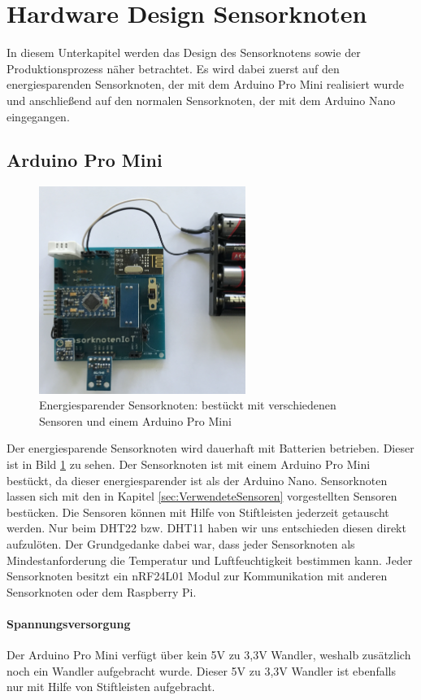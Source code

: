 \section{Hardware Design Sensorknoten}
\label{sec:HardwareDesign}
In diesem Unterkapitel werden das Design des Sensorknotens sowie der Produktionsprozess näher betrachtet. Es wird dabei zuerst auf den energiesparenden Sensorknoten, der mit dem Arduino Pro Mini realisiert wurde und anschließend auf den normalen Sensorknoten, der mit dem Arduino Nano eingegangen.
\subsection{Arduino Pro Mini}
\begin{figure}
	\centering
	\includegraphics[width=0.6\textwidth]{bilder/mini_cutted}
	\caption[Energiesparender Sensorknoten]{Energiesparender Sensorknoten: bestückt mit verschiedenen Sensoren und einem Arduino Pro Mini}
	\label{img:ArduinoProMini}
\end{figure}
Der energiesparende Sensorknoten wird dauerhaft mit Batterien betrieben. Dieser ist in Bild \ref{img:ArduinoProMini} zu sehen. Der Sensorknoten ist mit einem Arduino Pro Mini bestückt, da dieser energiesparender ist als der Arduino Nano. Sensorknoten lassen sich mit den in Kapitel \ref{sec:VerwendeteSensoren} vorgestellten Sensoren bestücken. Die Sensoren können mit Hilfe von Stiftleisten jederzeit getauscht werden. Nur beim DHT22 bzw. DHT11 haben wir uns entschieden diesen direkt aufzulöten. Der Grundgedanke dabei war, dass jeder Sensorknoten als Mindestanforderung die Temperatur und Luftfeuchtigkeit bestimmen kann. Jeder Sensorknoten besitzt ein nRF24L01 Modul zur Kommunikation mit anderen Sensorknoten oder dem Raspberry Pi.
\paragraph{Spannungsversorgung} Der Arduino Pro Mini verfügt über kein 5V zu 3,3V Wandler, weshalb zusätzlich noch ein Wandler aufgebracht wurde. Dieser 5V zu 3,3V Wandler ist ebenfalls nur mit Hilfe von Stiftleisten aufgebracht. 

